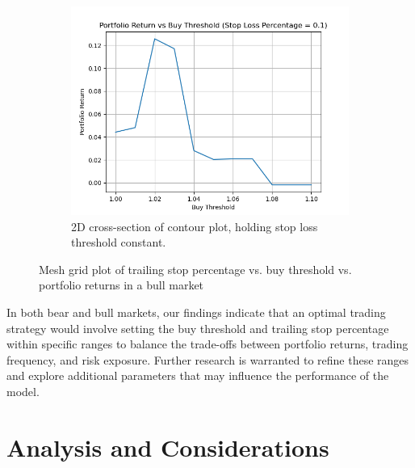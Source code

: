 \documentclass{article}
\begin{document}
\begin{figure}
\begin{subfigure}{0.495\textwidth}
    \end{subfigure}
    \label{fig:buyparameters}
    \begin{subfigure}{0.495\textwidth}
        \centering
        \includegraphics[width=\linewidth]{bullBuySlice.png}
        \caption{2D cross-section of contour plot, holding stop loss threshold constant.}
        \label{fig:bullstopPlot}
    \end{subfigure}
    \caption{Mesh grid plot of trailing stop percentage vs. buy threshold vs. portfolio returns in a bull market}

\end{figure}

In both bear and bull markets, our findings indicate that an optimal trading strategy would involve setting the buy threshold and trailing stop percentage within specific ranges to balance the trade-offs between portfolio returns, trading frequency, and risk exposure. Further research is warranted to refine these ranges and explore additional parameters that may influence the performance of the model.




\section{Analysis and Considerations}
\end{document}

